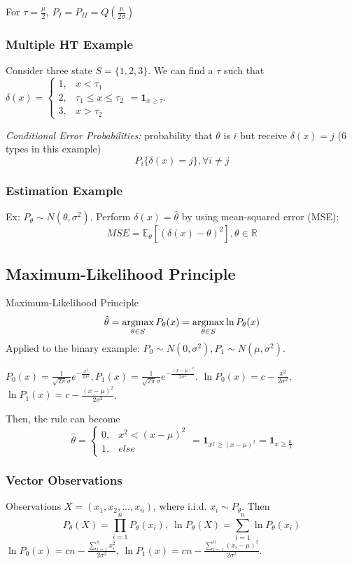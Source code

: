 \documentclass[11pt,a4paper]{article}
\newcommand{\argmax}{\operatornamewithlimits{argmax}}
\begin{document}
For $\tau=\frac{\mu}{2}$, $P_I=P_{II}=Q\left(\frac{\mu}{2\sigma}\right)$

\subsubsection*{Multiple HT Example}
Consider three state $S=\{1,2,3\}$.
We can find a $\tau$ such that $\delta(x)=\left\{\begin{matrix}
    1,&x< \tau_1\\
    2,& \tau_1\leq x\leq \tau_2\\
    3,& x>\tau_2
\end{matrix}\right.=\mathbf{1}_{x\geq \tau}$.

\textit{Conditional Error Probabilities:} probability that $\theta$ is $i$ but receive $\delta(x)=j$ (6 types in this example) $$P_i\{\delta(x)=j\}, \forall i\neq j$$

\subsubsection*{Estimation Example}
Ex: $P_\theta\sim N(\theta,\sigma^2)$. Perform $\delta(x)=\hat{\theta}$ by using mean-squared error (MSE):
$$MSE= \mathbb{E}_\theta \left[(\delta(x)-\theta)^2\right],\theta\in \mathbb{R}$$

\subsection{Maximum-Likelihood Principle}
Maximum-Likelihood Principle $$\hat{\theta}=\argmax_{\theta\in S}P_{\theta}(x)=\argmax_{\theta\in S}\ln P_{\theta}(x)$$
Applied to the binary example: $P_0\sim N(0,\sigma^2), P_1\sim N(\mu,\sigma^2)$.

$P_0(x)=\frac{1}{\sqrt{2\pi}\sigma}e^{-\frac{x^2}{2\sigma^2}}, P_1(x)=\frac{1}{\sqrt{2\pi}\sigma}e^{-\frac{(x-\mu)^2}{2\sigma^2}}$. $\ln P_0(x)=c-\frac{x^2}{2\sigma^2}$, $\ln P_1(x)=c-\frac{(x-\mu)^2}{2\sigma^2}$.

Then, the rule can become $$\hat{\theta}=\left\{\begin{matrix}
    0,&x^2<(x-\mu)^2\\
    1,&else
\end{matrix}\right.=\mathbf{1}_{x^2\geq (x-\mu)^2}=\mathbf{1}_{x\geq \frac{\mu}{2}}$$

\subsubsection*{Vector Observations}
Observations $X=\left(x_1,x_2,...,x_n\right)$, where i.i.d. $x_i\sim P_\theta$. Then $$P_\theta(X)=\prod_{i=1}^n P_\theta(x_i),\ \ln P_\theta(X)=\sum_{i=1}^n\ln P_\theta(x_i)$$
$\ln P_0(x)=cn-\frac{\sum_{i=1}^n x_i^2}{2\sigma^2}$, $\ln P_1(x)=cn-\frac{\sum_{i=1}^n(x_i-\mu)^2}{2\sigma^2}$.
\end{document}
